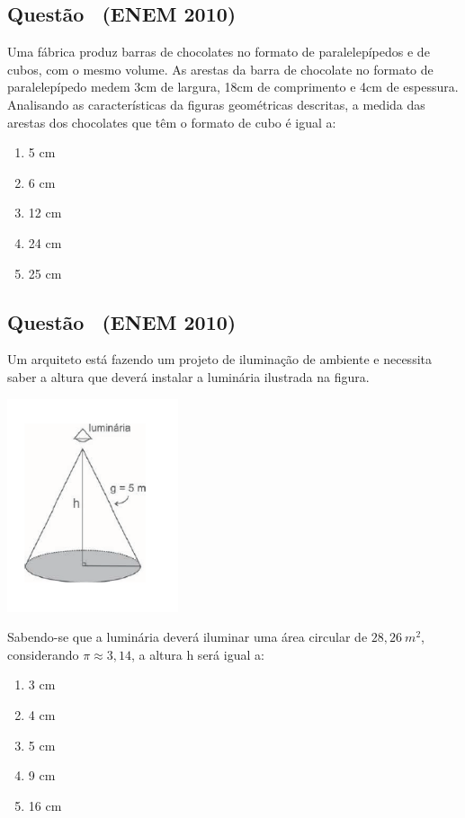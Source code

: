 \documentclass[12pt]{article}
\newcounter{questao}
\newcommand{\novaquestao}[1]{%
  \stepcounter{questao}%
  \subsection*{Questão \thequestao\ (#1)}%
}
\begin{document}
\begin{multicols}{2}
        \novaquestao{ENEM 2010}
            Uma fábrica produz barras de chocolates no formato de paralelepípedos e de cubos, com o mesmo volume. As arestas da barra de chocolate no formato de paralelepípedo medem 3cm de largura, 18cm de comprimento e 4cm de espessura. Analisando as características da figuras geométricas descritas, a medida das arestas dos chocolates que têm o formato de cubo é igual a:
            
            \begin{enumerate}[label=(\alph*), noitemsep]
                \item 5  cm
                \item {6  cm} %
                \item 12  cm
                \item 24  cm
                \item 25  cm 
            \end{enumerate}

        \novaquestao{ENEM 2010}
            Um arquiteto está fazendo um projeto de iluminação de ambiente e necessita saber a altura que deverá instalar a luminária ilustrada na figura.

            \begin{center}
                \includegraphics[scale=0.6]{q30.png}
            \end{center} Sabendo-se que a luminária deverá iluminar uma área circular de $28,26\ m^{2}$, considerando $\pi \approx 3,14$, a altura h será igual a:
        
            \begin{enumerate}[label=(\alph*), noitemsep]
                \item 3 cm
                \item {4 cm} %
                \item 5 cm
                \item 9 cm
                \item 16 cm 
            \end{enumerate}


\end{multicols}
\end{document}
